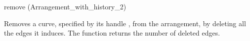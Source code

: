 
\ccRefPageBegin

\begin{ccRefFunction}{remove (Arrangement_with_history_2)}



   {Removes a curve, specified by its handle , from the arrangement,
    by deleting all the edges it induces. The function returns the number of
    deleted edges.}

\end{ccRefFunction}

\ccRefPageEnd
